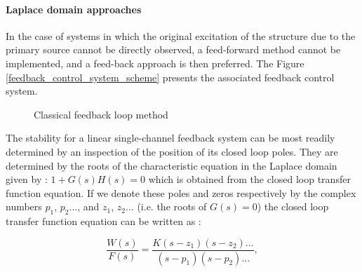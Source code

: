 \documentclass[11pt, twocolumn]{article}
\begin{document}
\paragraph{Laplace domain approaches}

In the case of systems in which the original excitation of the structure due to the primary source cannot be directly observed, a feed-forward method cannot be implemented, and a feed-back approach is then preferred. The Figure \ref{feedback_control_system_scheme} presents the associated feedback control system.  

\begin{figure}[H]
    \centering
    \caption{Classical feedback loop method}
    \label{classical_feedback_control_system_scheme}
\end{figure}


The stability for a linear single-channel feedback system can be most readily determined
by an inspection of the position of its closed loop poles. They are determined by the roots of the characteristic equation in the Laplace domain given by : $1 + G(s)H(s) = 0$ which is obtained from the closed loop transfer function equation. 
If we denote these poles and zeros respectively by the complex numbers $p_1$, $p_2 . . . $, and $z_1$, $z_2 . . .$ (i.e. the roots of $G(s)= 0$) the closed loop transfer function equation can be written as : 

\begin{equation}
\frac{W(s)}{F(s)} =  \frac{ K(s- z_1)(s- z_2)...}{(s -p_1)(s - p_2)...},
\label{transfer_function}
\end{equation}
\end{document}
